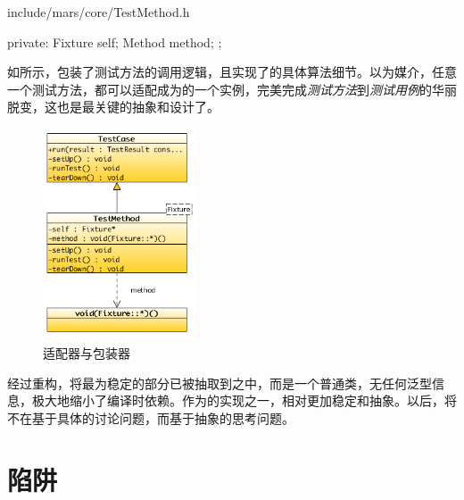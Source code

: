 \begin{content}
\begin{diff}{include/mars/core/TestMethod.h}
\begin{minicpp}
{private:
  Fixture self;
  Method method;
};
  \end{minicpp}
\end{diff}

如所示，包装了测试方法的调用逻辑，且实现了的具体算法细节。以为媒介，任意一个测试方法，都可以适配成为的一个实例，完美完成\emph{测试方法}到\emph{测试用例}的华丽脱变，这也是最关键的抽象和设计了。

\begin{figure}[H]
\centering
\includegraphics[width=0.4\textwidth]{figures/xunit/testcase-adapter.png}
\caption{适配器与包装器}
 \label{fig:testcase-adapter}
\end{figure}

经过重构，将最为稳定的部分已被抽取到之中，而是一个普通类，无任何泛型信息，极大地缩小了编译时依赖。作为的实现之一，相对更加稳定和抽象。以后，将不在基于具体的讨论问题，而基于抽象的思考问题。

\end{content}

\section{陷阱}

